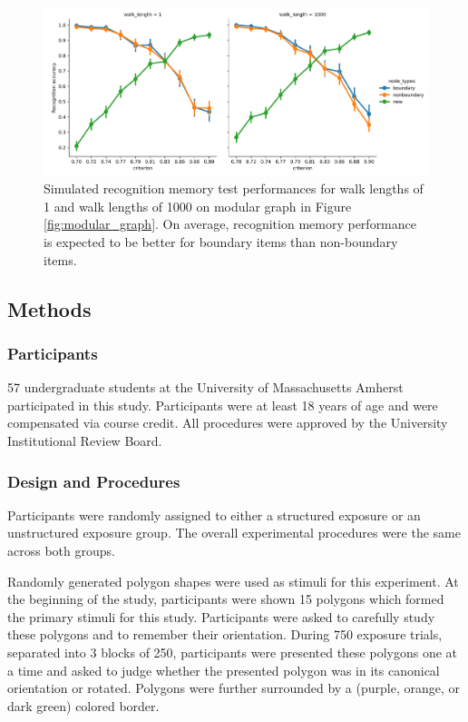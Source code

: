 \begin{figure}[ht]
    \centering
    \includegraphics[width = \textwidth]{chapter_notebooks/chapter_3/figures/recog_memory_with_criterion.png}
    \caption{Simulated recognition memory test performances for walk lengths of 1 and walk lengths of 1000 on modular graph in Figure \ref{fig:modular_graph}. On average, recognition memory performance is expected to be better for boundary items than non-boundary items.}
    \label{fig:recog_memory_sims_with_criterion}
\end{figure}



\subsection{Methods}
\subsubsection*{Participants}
57 undergraduate students at the University of Massachusetts Amherst participated in this study. Participants were at least 18 years of age and were compensated via course credit. All procedures were approved by the University Institutional Review Board. 

\subsubsection*{Design and Procedures}
Participants were randomly assigned to either a structured exposure or an unstructured exposure group. The overall experimental procedures were the same across both groups. 

Randomly generated polygon shapes were used as stimuli for this experiment. At the beginning of the study, participants were shown 15 polygons which formed the primary stimuli for this study. Participants were asked to carefully study these polygons and to remember their orientation. During 750 exposure trials, separated into 3 blocks of 250, participants were presented these polygons one at a time and asked to judge whether the presented polygon was in its canonical orientation or rotated. Polygons were further surrounded by a (purple, orange, or dark green) colored border.

